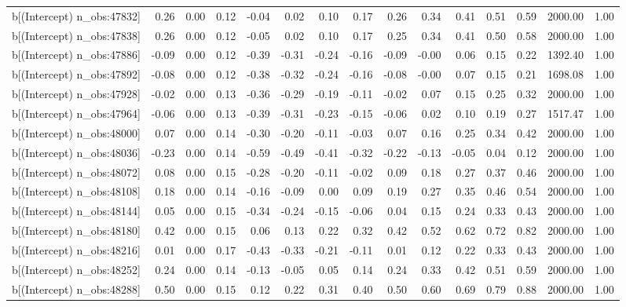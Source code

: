 \begin{table}[ht]
\begin{tabular}{rrrrrrrrrrrrrrr}
  b[(Intercept) n\_obs:47832] & 0.26 & 0.00 & 0.12 & -0.04 & 0.02 & 0.10 & 0.17 & 0.26 & 0.34 & 0.41 & 0.51 & 0.59 & 2000.00 & 1.00 \\ 
  b[(Intercept) n\_obs:47838] & 0.26 & 0.00 & 0.12 & -0.05 & 0.02 & 0.10 & 0.17 & 0.25 & 0.34 & 0.41 & 0.50 & 0.58 & 2000.00 & 1.00 \\ 
  b[(Intercept) n\_obs:47886] & -0.09 & 0.00 & 0.12 & -0.39 & -0.31 & -0.24 & -0.16 & -0.09 & -0.00 & 0.06 & 0.15 & 0.22 & 1392.40 & 1.00 \\ 
  b[(Intercept) n\_obs:47892] & -0.08 & 0.00 & 0.12 & -0.38 & -0.32 & -0.24 & -0.16 & -0.08 & -0.00 & 0.07 & 0.15 & 0.21 & 1698.08 & 1.00 \\ 
  b[(Intercept) n\_obs:47928] & -0.02 & 0.00 & 0.13 & -0.36 & -0.29 & -0.19 & -0.11 & -0.02 & 0.07 & 0.15 & 0.25 & 0.32 & 2000.00 & 1.00 \\ 
  b[(Intercept) n\_obs:47964] & -0.06 & 0.00 & 0.13 & -0.39 & -0.31 & -0.23 & -0.15 & -0.06 & 0.02 & 0.10 & 0.19 & 0.27 & 1517.47 & 1.00 \\ 
  b[(Intercept) n\_obs:48000] & 0.07 & 0.00 & 0.14 & -0.30 & -0.20 & -0.11 & -0.03 & 0.07 & 0.16 & 0.25 & 0.34 & 0.42 & 2000.00 & 1.00 \\ 
  b[(Intercept) n\_obs:48036] & -0.23 & 0.00 & 0.14 & -0.59 & -0.49 & -0.41 & -0.32 & -0.22 & -0.13 & -0.05 & 0.04 & 0.12 & 2000.00 & 1.00 \\ 
  b[(Intercept) n\_obs:48072] & 0.08 & 0.00 & 0.15 & -0.28 & -0.20 & -0.11 & -0.02 & 0.09 & 0.18 & 0.27 & 0.37 & 0.46 & 2000.00 & 1.00 \\ 
  b[(Intercept) n\_obs:48108] & 0.18 & 0.00 & 0.14 & -0.16 & -0.09 & 0.00 & 0.09 & 0.19 & 0.27 & 0.35 & 0.46 & 0.54 & 2000.00 & 1.00 \\ 
  b[(Intercept) n\_obs:48144] & 0.05 & 0.00 & 0.15 & -0.34 & -0.24 & -0.15 & -0.06 & 0.04 & 0.15 & 0.24 & 0.33 & 0.43 & 2000.00 & 1.00 \\ 
  b[(Intercept) n\_obs:48180] & 0.42 & 0.00 & 0.15 & 0.06 & 0.13 & 0.22 & 0.32 & 0.42 & 0.52 & 0.62 & 0.72 & 0.82 & 2000.00 & 1.00 \\ 
  b[(Intercept) n\_obs:48216] & 0.01 & 0.00 & 0.17 & -0.43 & -0.33 & -0.21 & -0.11 & 0.01 & 0.12 & 0.22 & 0.33 & 0.43 & 2000.00 & 1.00 \\ 
  b[(Intercept) n\_obs:48252] & 0.24 & 0.00 & 0.14 & -0.13 & -0.05 & 0.05 & 0.14 & 0.24 & 0.33 & 0.42 & 0.51 & 0.59 & 2000.00 & 1.00 \\ 
  b[(Intercept) n\_obs:48288] & 0.50 & 0.00 & 0.15 & 0.12 & 0.22 & 0.31 & 0.40 & 0.50 & 0.60 & 0.69 & 0.79 & 0.88 & 2000.00 & 1.00 \\ 

\end{tabular}
\end{table}

